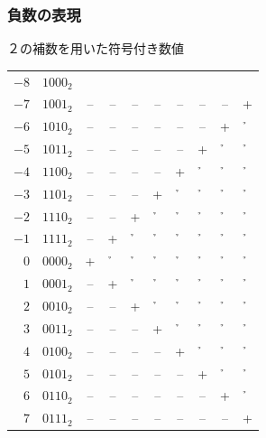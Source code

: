 \documentclass{beamer}                 %
\begin{document}
\begin{frame}
  \frametitle{負数の表現}
  \begin{itembox}[l]{２の補数を用いた符号付き数値}
    \small\begin{tabular}{ r l c c c c c c c c }
    $-8$  & $1000_2$ &  &  &  &  &  &  &  &  \\
    $-7$  & $1001_2$ &--&--&--&--&--&--&--&+ \\
    $-6$  & $1010_2$ &--&--&--&--&--&--&+ &\h\\
    $-5$  & $1011_2$ &--&--&--&--&--&+ &\h&\h\\
    $-4$  & $1100_2$ &--&--&--&--&+ &\h&\h&\h\\
    $-3$  & $1101_2$ &--&--&--&+ &\h&\h&\h&\h\\
    $-2$  & $1110_2$ &--&--&+ &\h&\h&\h&\h&\h\\
    $-1$  & $1111_2$ &--&+ &\h&\h&\h&\h&\h&\h\\
    $ 0$  & $0000_2$ &+ &\h&\h&\h&\h&\h&\h&\h\\
    $ 1$  & $0001_2$ &--&+ &\h&\h&\h&\h&\h&\h\\
    $ 2$  & $0010_2$ &--&--&+ &\h&\h&\h&\h&\h\\
    $ 3$  & $0011_2$ &--&--&--&+ &\h&\h&\h&\h\\
    $ 4$  & $0100_2$ &--&--&--&--&+ &\h&\h&\h\\
    $ 5$  & $0101_2$ &--&--&--&--&--&+ &\h&\h\\
    $ 6$  & $0110_2$ &--&--&--&--&--&--&+ &\h\\
    $ 7$  & $0111_2$ &--&--&--&--&--&--&--&+ \\
    \end{tabular}
  \end{itembox}
\end{frame}
\end{document}
